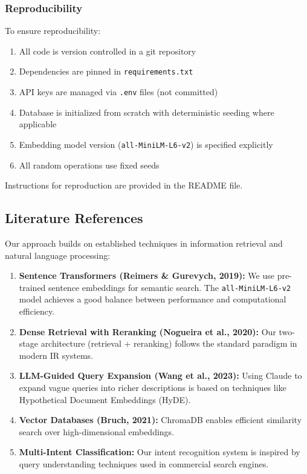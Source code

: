 \documentclass[11pt,a4paper]{article}
\begin{document}
\subsubsection{Reproducibility}

To ensure reproducibility:

\begin{enumerate}
    \item All code is version controlled in a git repository
    \item Dependencies are pinned in \texttt{requirements.txt}
    \item API keys are managed via \texttt{.env} files (not committed)
    \item Database is initialized from scratch with deterministic seeding where applicable
    \item Embedding model version (\texttt{all-MiniLM-L6-v2}) is specified explicitly
    \item All random operations use fixed seeds
\end{enumerate}

Instructions for reproduction are provided in the README file.

\subsection{Literature References}

Our approach builds on established techniques in information retrieval and natural language processing:

\begin{enumerate}
    \item \textbf{Sentence Transformers (Reimers \& Gurevych, 2019):} We use pre-trained sentence embeddings for semantic search. The \texttt{all-MiniLM-L6-v2} model achieves a good balance between performance and computational efficiency.
    \item \textbf{Dense Retrieval with Reranking (Nogueira et al., 2020):} Our two-stage architecture (retrieval + reranking) follows the standard paradigm in modern IR systems.
    \item \textbf{LLM-Guided Query Expansion (Wang et al., 2023):} Using Claude to expand vague queries into richer descriptions is based on techniques like Hypothetical Document Embeddings (HyDE).
    \item \textbf{Vector Databases (Bruch, 2021):} ChromaDB enables efficient similarity search over high-dimensional embeddings.
    \item \textbf{Multi-Intent Classification:} Our intent recognition system is inspired by query understanding techniques used in commercial search engines.
\end{enumerate}
\end{document}
